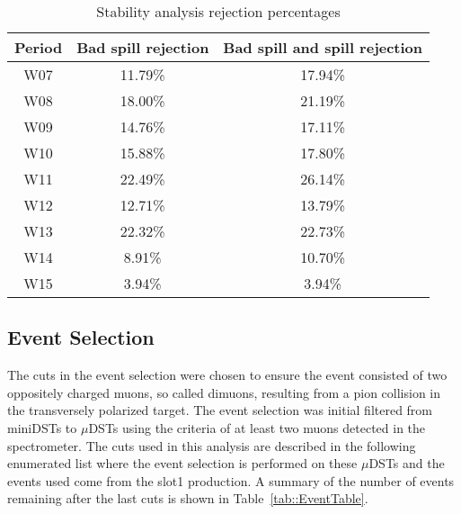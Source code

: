 \begin{table}[h!t]
  \centering
  \label{tab::badspillpercent}
  \caption{Stability analysis rejection percentages}
  \begin{tabular}{ |c|c|c| }
    \hline \textbf{Period}& \textbf{Bad spill rejection}&
    \textbf{Bad spill and spill rejection} \\ \hline \hline
    
    W07& 11.79\%& 17.94\%\\ \hline
    W08& 18.00\%& 21.19\%\\ \hline
    W09& 14.76\%& 17.11\%\\ \hline
    W10& 15.88\%& 17.80\%\\ \hline
    W11& 22.49\%& 26.14\%\\ \hline
    W12& 12.71\%& 13.79\%\\ \hline
    W13& 22.32\%& 22.73\%\\ \hline
    W14& 8.91\%& 10.70\%\\ \hline
    W15& 3.94\%& 3.94\%\\ \hline

  \end{tabular}
\end{table}

\subsection{Event Selection} \label{sec::dy_eventselection}
The cuts in the event selection were chosen to ensure the event consisted of two
oppositely charged muons, so called dimuons, resulting from a pion collision in
the transversely polarized target.  The event selection was initial filtered
from miniDSTs to $\mu$DSTs using the criteria of at least two muons detected in
the spectrometer.  The cuts used in this analysis are described in the following
enumerated list where the event selection is performed on these $\mu$DSTs and
the events used come from the slot1 production.  A summary of the number of
events remaining after the last cuts is shown in Table~\ref{tab::EventTable}.

